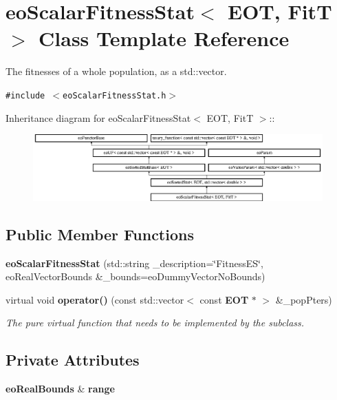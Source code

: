 \section{eo\-Scalar\-Fitness\-Stat$<$ EOT, Fit\-T $>$ Class Template Reference}
\label{classeo_scalar_fitness_stat}
The fitnesses of a whole population, as a std::vector.  


{\tt \#include $<$eo\-Scalar\-Fitness\-Stat.h$>$}

Inheritance diagram for eo\-Scalar\-Fitness\-Stat$<$ EOT, Fit\-T $>$::\begin{figure}[H]
\begin{center}
\leavevmode
\includegraphics[height=2.55708cm]{classeo_scalar_fitness_stat}
\end{center}
\end{figure}
\subsection*{Public Member Functions}
\begin{CompactItemize}
\item 
{\bf eo\-Scalar\-Fitness\-Stat} (std::string \_\-description=\char`\"{}Fitness\-ES\char`\"{}, eo\-Real\-Vector\-Bounds \&\_\-bounds=eo\-Dummy\-Vector\-No\-Bounds)\label{classeo_scalar_fitness_stat_a0}

\item 
virtual void {\bf operator()} (const std::vector$<$ const {\bf EOT} $\ast$ $>$ \&\_\-pop\-Pters)\label{classeo_scalar_fitness_stat_a1}

\begin{CompactList}\small\item\em The pure virtual function that needs to be implemented by the subclass. \item\end{CompactList}\end{CompactItemize}
\subsection*{Private Attributes}
\begin{CompactItemize}
\item 
{\bf eo\-Real\-Bounds} \& {\bf range}\label{classeo_scalar_fitness_stat_r0}

\end{CompactItemize}


